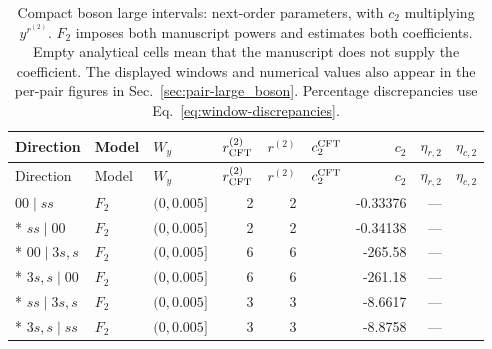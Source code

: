 \begingroup\setlength{\tabcolsep}{2pt}
\begin{longtable}{lllrrrrrr}
\caption{Compact boson large intervals: next-order parameters, with $c_2$ multiplying $y^{r^{(2)}}$. $F_2$ imposes both manuscript powers and estimates both coefficients. Empty analytical cells mean that the manuscript does not supply the coefficient. The displayed windows and numerical values also appear in the per-pair figures in Sec.~\ref{sec:pair-large_boson}. Percentage discrepancies use Eq.~\eqref{eq:window-discrepancies}.}
\label{tab:window-large_boson-second}\\\toprule
Direction & Model & $W_y$ & $r^{(2)}_{\rm CFT}$ & $r^{(2)}$ & $c_2^{\rm CFT}$ & $c_2$ & $\eta_{r,2}$ & $\eta_{c,2}$\\\midrule
\endfirsthead
\toprule
Direction & Model & $W_y$ & $r^{(2)}_{\rm CFT}$ & $r^{(2)}$ & $c_2^{\rm CFT}$ & $c_2$ & $\eta_{r,2}$ & $\eta_{c,2}$\\\midrule
\endhead
\bottomrule\endfoot
$00\mid ss$ & $F_2$ & $(0,0.005]$ & 2 & 2 &  & -0.33376 & --- & \\*
$ss\mid 00$ & $F_2$ & $(0,0.005]$ & 2 & 2 &  & -0.34138 & --- & \\*
$00\mid 3s,s$ & $F_2$ & $(0,0.005]$ & 6 & 6 &  & -265.58 & --- & \\*
$3s,s\mid 00$ & $F_2$ & $(0,0.005]$ & 6 & 6 &  & -261.18 & --- & \\*
$ss\mid 3s,s$ & $F_2$ & $(0,0.005]$ & 3 & 3 &  & -8.6617 & --- & \\*
$3s,s\mid ss$ & $F_2$ & $(0,0.005]$ & 3 & 3 &  & -8.8758 & --- & \\
\end{longtable}
\endgroup

